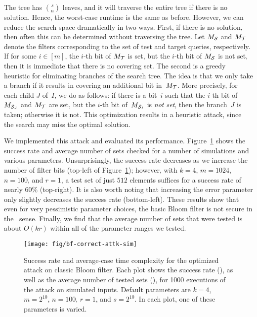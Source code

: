 The tree has $\binom{s}{n}$ leaves, and it will traverse the entire tree if
there is no solution. Hence, the worst-case runtime is the same as before.
However, we can reduce the search space dramatically in two ways.
%
First, if there is no solution, then often this can be determined without
traversing the tree. Let $M_{\mathcal{S}}$ and $M_{\mathcal{T}}$ denote the filters
corresponding to the set of test and target queries, respectively.  If for some
$i \in [m]$, the $i$-th bit of $M_{\mathcal{T}}$ is set, but the $i$-th bit of $M_{\mathcal{S}}$
is not set, then it is immediate that there is no covering set.
%
The second is a greedy heuristic for eliminating branches of the search tree.
The idea is that we only take a branch if it results in covering an additional
bit in~$M_{\mathcal{T}}$. More precisely, for each child $J$ of~$I$, we do as follows:
if there is a bit~$i$ such that the $i$-th bit of $M_{\mathcal{S}_J}$ and $M_{\mathcal{T}}$
are set, but the $i$-th bit of~$M_{\mathcal{S}_I}$ is \emph{not set}, then the
branch~$J$ is taken; otherwise it is not.
%
This optimization results in a heuristic attack, since the search may miss the
optimal solution.

We implemented this attack and evaluated its performance.
Figure~\ref{fig:bf-correct-attk-sim} shows the success rate and average number
of sets checked for a number of simulations and various parameters.
%
Unsurprisingly, the success rate decreases as we increase the number of filter
bits (top-left of Figure~\ref{fig:bf-correct-attk-sim}); however, with $k=4$,
$m=1024$, $n=100$, and $r=1$, a test set of just $512$ elements suffices for a
success rate of nearly $60\%$ (top-right). It is also worth noting that
increasing the error parameter only slightly decreases the success rate
(bottom-left). These results show that even for very pessimistic parameter
choices, the basic Bloom filter is not secure in the \ sense.
%
Finally, we find that the average number of sets that were tested is about
$O(kr)$ within all of the parameter ranges we tested.

%
\begin{figure}
  \texttt{[image: fig/bf-correct-attk-sim]}
  \caption{
  Success rate and average-case time complexity for the optimized attack on classic
  Bloom filter.
  Each plot shows the success rate (\scriptsize{}), as well as the average number
  of tested sets (\scriptsize{}), for 1000 executions of
  the attack on simulated inputs.
  Default parameters are $k=4$, $m=2^{10}$, $n=100$, $r=1$, and $s=2^{10}$.
  In each plot, one of these parameters is varied.
  }
  \label{fig:bf-correct-attk-sim}
\end{figure}

